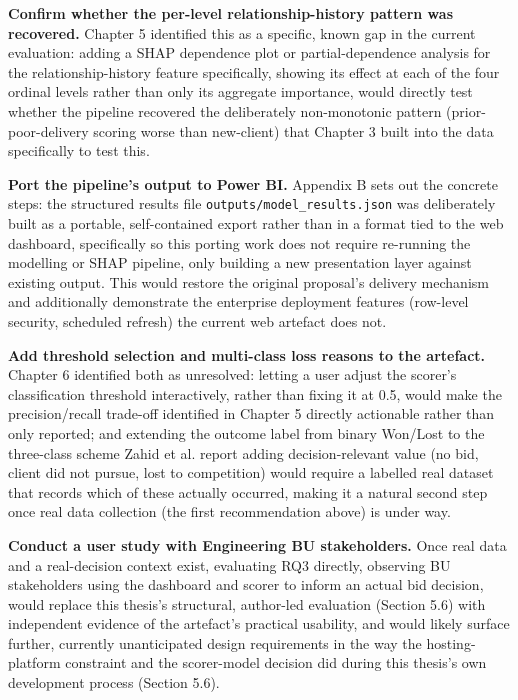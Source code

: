 \textbf{Confirm whether the per-level relationship-history pattern was
recovered.} Chapter 5 identified this as a specific, known gap in the
current evaluation: adding a SHAP dependence plot or partial-dependence
analysis for the relationship-history feature specifically, showing its
effect at each of the four ordinal levels rather than only its aggregate
importance, would directly test whether the pipeline recovered the
deliberately non-monotonic pattern (prior-poor-delivery scoring worse
than new-client) that Chapter 3 built into the data specifically to test
this.

\textbf{Port the pipeline's output to Power BI.} Appendix B sets out the
concrete steps: the structured results file
\texttt{outputs/model\_results.json} was deliberately built as a
portable, self-contained export rather than in a format tied to the web
dashboard, specifically so this porting work does not require re-running
the modelling or SHAP pipeline, only building a new presentation layer
against existing output. This would restore the original proposal's
delivery mechanism and additionally demonstrate the enterprise
deployment features (row-level security, scheduled refresh) the current
web artefact does not.

\textbf{Add threshold selection and multi-class loss reasons to the
artefact.} Chapter 6 identified both as unresolved: letting a user
adjust the scorer's classification threshold interactively, rather than
fixing it at 0.5, would make the precision/recall trade-off identified
in Chapter 5 directly actionable rather than only reported; and
extending the outcome label from binary Won/Lost to the three-class
scheme Zahid et al. \citeyearpar{zahid2021predicting} report adding
decision-relevant value (no bid, client did not pursue, lost to
competition) would require a labelled real dataset that records which of
these actually occurred, making it a natural second step once real data
collection (the first recommendation above) is under way.

\textbf{Conduct a user study with Engineering BU stakeholders.} Once
real data and a real-decision context exist, evaluating RQ3 directly,
observing BU stakeholders using the dashboard and scorer to inform an
actual bid decision, would replace this thesis's structural, author-led
evaluation (Section 5.6) with independent evidence of the artefact's
practical usability, and would likely surface further, currently
unanticipated design requirements in the way the hosting-platform
constraint and the scorer-model decision did during this thesis's own
development process (Section 5.6).

